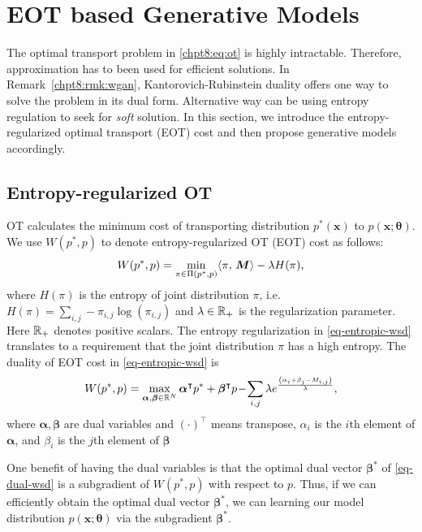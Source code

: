 \section{EOT based Generative Models}

The optimal transport problem in \eqref{chpt8:eq:ot} is highly intractable. Therefore, approximation has to been used for efficient solutions. In Remark~\ref{chpt8:rmk:wgan}, Kantorovich-Rubinstein duality offers one way to solve the problem in its dual form. Alternative way can be using entropy regulation to seek for \textit{soft} solution.  In this section, we introduce the entropy-regularized optimal transport (EOT) cost and then propose generative models accordingly.

\subsection{Entropy-regularized OT} 

OT calculates the minimum cost of transporting distribution $p^{\ast}(\bm{x})$ to $p(\bm{x}; \bm{\theta})$. We use $W(p^{\ast},p)$ to denote entropy-regularized OT (EOT) cost as follows:
\begin{equation}\label{eq-entropic-wsd}
  W(p^{\ast},p)=\min_{ \pi \in \Pi(p^{\ast}, p)} \langle \pi,\,\bm{M}\rangle - \lambda H(\pi),
\end{equation}
where $H(\pi)$ is the entropy of joint distribution $\pi$, i.e. $H(\pi) = \sum_{i,j} -\pi_{i,j}
\log(\pi_{i,j})$ and $\lambda \in \mathbb{R}_{+}$ is the regularization
parameter. Here $\mathbb{R}_{+}$ denotes positive scalars. The entropy regularization in \eqref{eq-entropic-wsd}  translates 
to a requirement that the joint distribution $\pi$ has a high entropy. 
 The duality of EOT cost in \eqref{eq-entropic-wsd} is
\begin{equation}\label{eq-dual-wsd}
  W(p^{\ast}, p)  =  \max_{\bm{\al}, \bm{\be} \in \mathbb{R}^{N}} \bm{\al}^{\intercal}p^{\ast} + \bm{\beta}^{\intercal}p \! - \!
  \sum_{i,j} \lambda e^{ \frac{{\left( \al_i + \beta_j - M_{i,j} \right)}}{\la} },\vspace{-2pt}
\end{equation}
where $\bm{\alpha},\bm{\beta}$ are dual variables and $(\cdot)^{\intercal}$ means transpose, $\alpha_i$ is the $i$th element of $\bm{\alpha}$, and $\beta_i$ is the $j$th element of $\bm{\beta}$

One benefit of having the dual variables is that the optimal dual vector $\bm{\beta}^{\ast}$
of \eqref{eq-dual-wsd} is a subgradient of $W(p^{\ast},p)$ with respect to $p$. Thus, if we can efficiently obtain the optimal dual vector $\bm{\beta}^{\ast}$, we can learning our model distribution $p(\bm{x}; \bm{\theta})$ via the subgradient $\bm{\beta}^{\ast}$.

